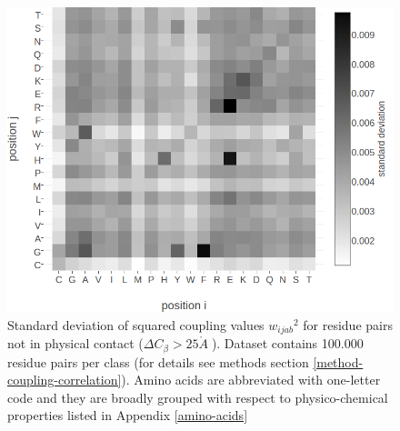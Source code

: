 \documentclass[11pt,a4paper,twoside]{book}
\newcommand{\Cb}{C_\beta}
\newcommand{\wijab}{w_{ijab}}
\newcommand{\angstrom}{\mathring{A} \;}
\theoremstyle{definition}
\theoremstyle{definition}
\theoremstyle{remark}
\begin{document}
\begin{figure}
\includegraphics[width=1\linewidth]{img/coupling_matrix_analysis/stdev_squared_couplings_noncontacts_heatmap_notitle} \caption{Standard deviation of
squared coupling values \({\wijab}^2\) for residue pairs not in physical
contact (\(\Delta \Cb > 25 \angstrom\)). Dataset contains 100.000
residue pairs per class (for details see methods section
\ref{method-coupling-correlation}). Amino acids are abbreviated with
one-letter code and they are broadly grouped with respect to
physico-chemical properties listed in Appendix \ref{amino-acids}}\label{fig:stdev-squared-couplings-noncontacts}
\end{figure}
\end{document}
